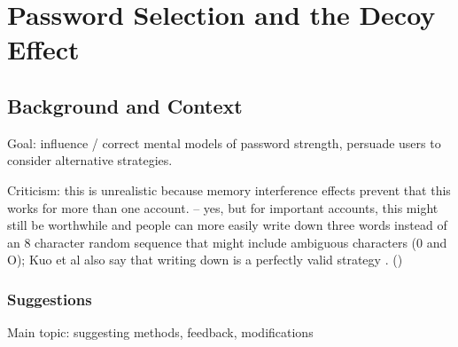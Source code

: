 \chapter[Password Selection and the Decoy Effect]{Password Selection and the Decoy Effect}\label{chap:decoy}




\section{Background and Context}

Goal: influence / correct mental models of password strength, persuade users to consider alternative strategies. 

Criticism: this is unrealistic because memory interference effects prevent that this works for more than one account. -- yes, but for important accounts, this might still be worthwhile and people can more easily write down three words instead of an 8 character random sequence that might include ambiguous characters (0 and O); Kuo et al also say that writing down is a perfectly valid strategy \cite{Kuo2006HumanSelectionMnemonic}. ()

\subsection{Suggestions}
Main topic: suggesting methods, feedback, modifications
\cite{Ur2012HelpingUsersCreateBetterPasswords}
\cite{Shay2012CorrectHorseBatteryStaple}
\cite{Shay2014CanLongPasswordsBeSecureAndUsable}
\cite{Forget2008ImprovingPasswordsThroughPersuasion}



